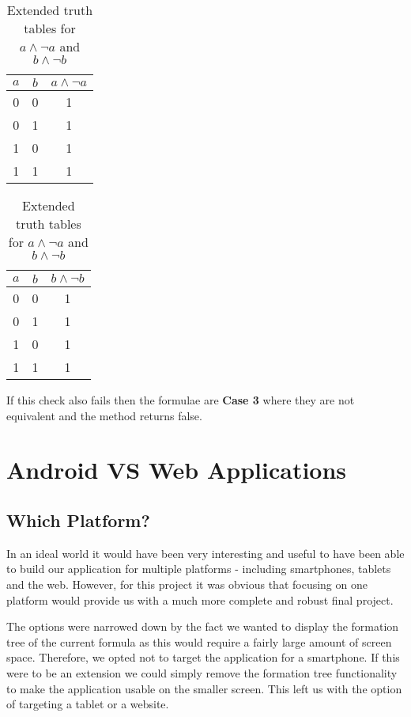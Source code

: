 \documentclass{report}
\begin{document}
\begin{table}[h]
  \begin{center}
\begin{tabular}{ | c | c || c | }
      \hline
      $a$ & $b$ & $a\land\lnot a$ \\ \hline
      0 & 0 & 1 \\
      0 & 1 & 1 \\
      1 & 0 & 1 \\
      1 & 1 & 1 \\
      \hline
\end{tabular}
\hspace{15mm}
\begin{tabular}{ | c | c || c | }
      \hline
      $a$ & $b$ & $b\land\lnot b$ \\ \hline
      0 & 0 & 1 \\
      0 & 1 & 1 \\
      1 & 0 & 1 \\
      1 & 1 & 1 \\
      \hline
\end{tabular}
  \end{center}
  \caption{Extended truth tables for $a\land\lnot a$ and $b\land\lnot b$}
  \label{table:extended_a_and_not_a}
\end{table}

If this check also fails then the formulae are \textbf{Case 3} where they are not equivalent and the method returns false.

\chapter{Android VS Web Applications}
\label{chap:android_vs_web}

\section{Which Platform?}

In an ideal world it would have been very interesting and useful to have been able to build our application for multiple platforms - including smartphones, tablets and the web. However, for this project it was obvious that focusing on one platform would provide us with a much more complete and robust final project.

The options were narrowed down by the fact we wanted to display the formation tree of the current formula as this would require a fairly large amount of screen space. Therefore, we opted not to target the application for a smartphone. If this were to be an extension we could simply remove the formation tree functionality to make the application usable on the smaller screen. This left us with the option of targeting a tablet or a website.
\end{document}
